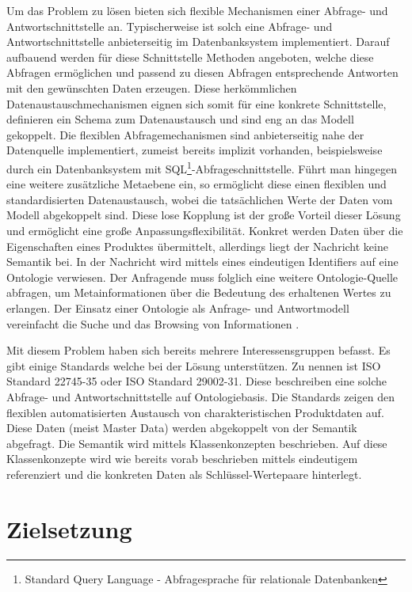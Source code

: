 Um das Problem zu lösen bieten sich flexible Mechanismen einer Abfrage- und Antwortschnittstelle an. Typischerweise ist solch eine Abfrage- und Antwortschnittstelle anbieterseitig im Datenbanksystem implementiert. Darauf aufbauend werden für diese Schnittstelle Methoden angeboten, welche diese Abfragen ermöglichen und passend zu diesen Abfragen entsprechende Antworten mit den gewünschten Daten erzeugen. 
Diese herkömmlichen Datenaustauschmechanismen eignen sich somit für eine konkrete Schnittstelle, definieren ein Schema zum Datenaustausch und sind eng an das Modell gekoppelt. Die flexiblen Abfragemechanismen sind anbieterseitig nahe der Datenquelle implementiert, zumeist bereits implizit vorhanden, beispielsweise durch ein Datenbanksystem mit SQL\footnote{Standard Query Language - Abfragesprache für relationale Datenbanken}-Abfrageschnittstelle. 
Führt man hingegen eine weitere zusätzliche Metaebene ein, so ermöglicht diese einen flexiblen und standardisierten Datenaustausch, wobei die tatsächlichen Werte der Daten vom Modell abgekoppelt sind. Diese lose Kopplung ist der große Vorteil dieser Lösung und ermöglicht eine große Anpassungsflexibilität. Konkret werden Daten über die Eigenschaften eines Produktes übermittelt, allerdings liegt der Nachricht keine Semantik bei. In der Nachricht wird mittels eines eindeutigen Identifiers auf eine \gls{Ontologie} verwiesen. Der Anfragende muss folglich eine weitere \gls{Ontologie}-Quelle abfragen, um Metainformationen über die Bedeutung des erhaltenen Wertes zu erlangen. 
Der Einsatz einer \gls{Ontologie} als Anfrage- und Antwortmodell vereinfacht die Suche und das Browsing von Informationen \citep[vgl.][S. 24f]{Hemmje}.

Mit diesem Problem haben sich bereits mehrere Interessensgruppen befasst. Es gibt einige Standards welche bei der Lösung unterstützen. Zu nennen ist ISO Standard 22745-35 oder ISO Standard 29002-31. Diese beschreiben eine solche Abfrage- und Antwortschnittstelle auf Ontologiebasis. Die Standards zeigen den flexiblen automatisierten Austausch von charakteristischen Produktdaten auf. Diese Daten (meist Master Data) werden abgekoppelt von der Semantik abgefragt. Die Semantik wird mittels Klassenkonzepten beschrieben. Auf diese Klassenkonzepte wird wie bereits vorab beschrieben mittels eindeutigem  referenziert und die konkreten Daten als Schlüssel-Wertepaare hinterlegt.  

\section{Zielsetzung}

